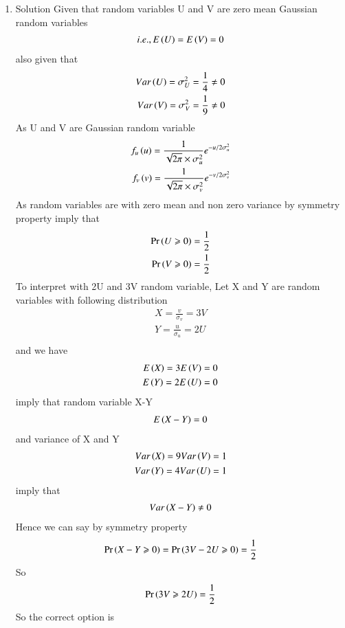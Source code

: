 \documentclass[journal,12pt,twocolumn]{IEEEtran}
\begin{document}
\begin{enumerate}
\begin{enumerate}[]
\end{enumerate}
\item Solution
Given that random variables U and V are zero mean Gaussian random variables
\begin{align}
i.e., E\left(U\right)=E\left(V\right)=0 
\end{align}
also given that
\begin{align}
 Var\left(U\right)=\sigma^2_U=\frac{1}{4} \neq 0\\                                 Var\left(V\right)=\sigma^2_V=\frac{1}{9} \neq 0
\end{align}
As U and V are Gaussian random variable
\begin{align}
f_u\left(u\right)=\frac{1}{\sqrt{2\pi}\times\sigma^2_u}e^{{-u}/{2\sigma^2_u}}\\
f_v\left(v\right)=\frac{1}{\sqrt{2\pi}\times\sigma^2_v}e^{{-v}/{2\sigma^2_v}}
\end{align}
As random variables are with zero mean and non zero variance by symmetry property imply that
\begin{align}
\Pr\left(U\geqslant0\right)=\frac{1}{2}\\
\Pr\left(V\geqslant0\right)=\frac{1}{2}
\end{align}
To interpret with 2U and 3V random variable, Let X and Y are random variables with following distribution 
\begin{align}
X = \frac{v}{\sigma_v}=3V\\
Y = \frac{u}{\sigma_u}=2U\\
\end{align}
and we have
\begin{align}
E\left(X\right)=3E\left(V\right)=0\\
E\left(Y\right)=2E\left(U\right)=0
\end{align}
imply that random variable X-Y
\begin{align}
E\left(X-Y\right)=0
\end{align}
and variance of X and Y
\begin{align}
Var\left(X\right)=9Var\left(V\right)=1\\
Var\left(Y\right)=4Var\left(U\right)=1
\end{align}
imply that
\begin{align}
Var\left(X-Y\right)\neq 0
\end{align}
Hence we can say by symmetry property
\begin{align}
\Pr\left(X-Y\geqslant0\right)=\Pr\left(3V-2U\geqslant0\right)=\frac{1}{2}  
\end{align}
So
\begin{align}
\Pr\left(3V\geqslant2U\right)=\frac{1}{2}
\end{align}
So the correct option is 
\end{enumerate}
\end{document}
